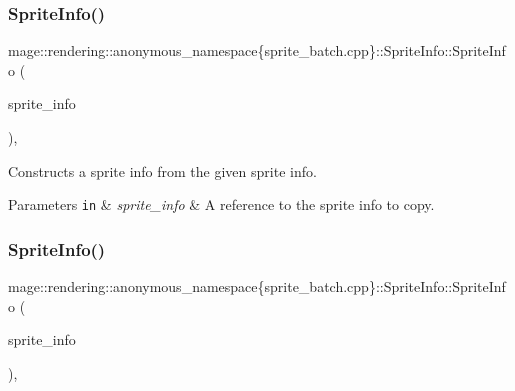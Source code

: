 \subsubsection{\texorpdfstring{Sprite\+Info()}{SpriteInfo()}\hspace{0.1cm}{\footnotesize\ttfamily [2/3]}}
{\footnotesize\ttfamily mage\+::rendering\+::anonymous\+\_\+namespace\{sprite\+\_\+batch.\+cpp\}\+::Sprite\+Info\+::\+Sprite\+Info (\begin{DoxyParamCaption}\item[{const \mbox{\hyperlink{structmage_1_1rendering_1_1anonymous__namespace_02sprite__batch_8cpp_03_1_1_sprite_info}{Sprite\+Info}} \&}]{sprite\+\_\+info }\end{DoxyParamCaption})\hspace{0.3cm}{\ttfamily [default]}, {\ttfamily [noexcept]}}

Constructs a sprite info from the given sprite info.


\begin{DoxyParams}[1]{Parameters}
\mbox{\tt in}  & {\em sprite\+\_\+info} & A reference to the sprite info to copy. \\
\hline
\end{DoxyParams}
\mbox{\label{structmage_1_1rendering_1_1anonymous__namespace_02sprite__batch_8cpp_03_1_1_sprite_info_ab9f311cff57a9056e9ac71d06ea304b6}} 
\subsubsection{\texorpdfstring{Sprite\+Info()}{SpriteInfo()}\hspace{0.1cm}{\footnotesize\ttfamily [3/3]}}
{\footnotesize\ttfamily mage\+::rendering\+::anonymous\+\_\+namespace\{sprite\+\_\+batch.\+cpp\}\+::Sprite\+Info\+::\+Sprite\+Info (\begin{DoxyParamCaption}\item[{\mbox{\hyperlink{structmage_1_1rendering_1_1anonymous__namespace_02sprite__batch_8cpp_03_1_1_sprite_info}{Sprite\+Info}} \&\&}]{sprite\+\_\+info }\end{DoxyParamCaption})\hspace{0.3cm}{\ttfamily [default]}, {\ttfamily [noexcept]}}

